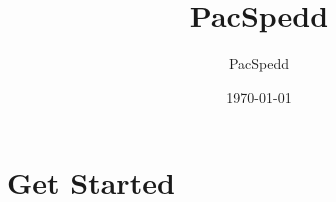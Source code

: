 \documentclass{article}
\title{PacSpedd}
\author{PacSpedd}
\date{\today}
\begin{document}
\maketitle

\tableofcontents

\section{Get Started}
\end{document}
